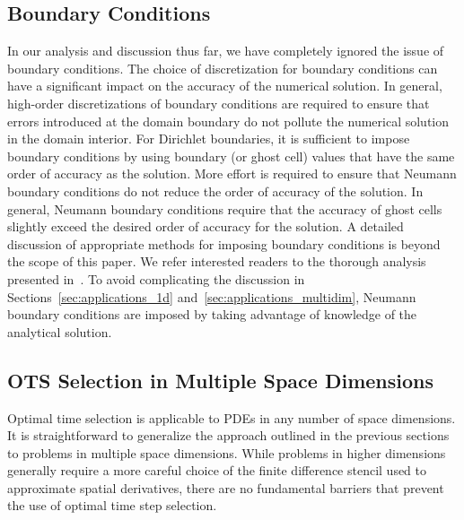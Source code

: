 \documentclass[oneeqnum,onefignum,onetabnum,onethmnum]{siamltex}
\begin{document}
\subsection{Boundary Conditions}
In our analysis and discussion thus far, we have completely ignored the issue 
of boundary conditions.  The choice of discretization for boundary conditions
can have a significant impact on the accuracy of the numerical solution.  In 
general, high-order discretizations of boundary conditions are required to 
ensure that errors introduced at the domain boundary do not pollute the 
numerical solution in the domain interior.  For Dirichlet boundaries, it
is sufficient to impose boundary conditions by using boundary (or ghost cell) 
values that have the same order of accuracy as the solution.  
More effort is required to ensure that Neumann boundary conditions do not
reduce the order of accuracy of the solution.  In general, Neumann boundary
conditions require that the accuracy of ghost cells slightly exceed the 
desired order of accuracy for the solution.  A detailed discussion of 
appropriate methods for imposing boundary conditions is beyond the scope of 
this paper.  We refer interested readers to the thorough analysis presented
in~\cite{gko_book}.  To avoid complicating the discussion in 
Sections~\ref{sec:applications_1d} and~\ref{sec:applications_multidim}, 
Neumann boundary conditions are imposed by taking advantage of knowledge of 
the analytical solution.


\subsection{\label{sec:ots_higher_spatial_dims}
            OTS Selection in Multiple Space Dimensions}
Optimal time selection is applicable to PDEs in any number of space
dimensions.  It is straightforward to generalize the approach outlined in 
the previous sections to problems in multiple space dimensions.  While 
problems in higher dimensions generally require a more careful choice of 
the finite difference stencil used to approximate spatial derivatives,
there are no fundamental barriers that prevent the use of optimal time step 
selection.
\end{document}
